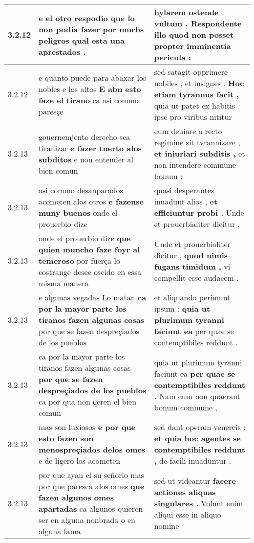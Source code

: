 \begin{tabular}{|p{1cm}|p{6.5cm}|p{6.5cm}|}
3.2.12 & e el otro respodio \textbf{ que lo non podia fazer } por muchs peligros qual esta una aprestados . & hylarem ostende vultum . \textbf{ Respondente illo quod non posset } propter imminentia pericula : \\\hline
3.2.12 & e quanto puede para abaxar los nobles e los altos \textbf{ E abn esto faze el tirano } ca asi commo paresçe & sed satagit opprimere nobiles , et insignes . \textbf{ Hoc etiam tyrannus facit , } quia ut patet ex habitis ipse pro viribus nititur \\\hline
3.2.13 & gouernemjento derecho sea tiranizar \textbf{ e fazer tuerto alos subditos } e non entender al bien comun & cum deuiare a recto regimine sit tyrannizare , \textbf{ et iniuriari subditis , } et non intendere commune bonum ; \\\hline
3.2.13 & asi commo desanparados acometen alos otros \textbf{ e fazense muny buenos } onde el prouerbio dize & quasi desperantes inuadunt alios , \textbf{ et efficiuntur probi . } Unde et prouerbialiter dicitur , \\\hline
3.2.13 & onde el prouerbio dize \textbf{ que quien muncho faze foyr al temeroso } por fuerça lo costrange desee oscido en essa misma manera & Unde et prouerbialiter dicitur , \textbf{ quod nimis fugans timidum , } vi compellit esse audacem . \\\hline
3.2.13 & e algunas vegadas Lo matan \textbf{ ca por la mayor parte los tiranos fazen algunas cosas } por que se fazen despreçiados de los pueblos & et aliquando perimunt ipsum : \textbf{ quia ut plurimum tyranni faciunt ea } per quae se contemptibiles reddunt . \\\hline
3.2.13 & ca por la mayor parte los tiranos fazen algunas cosas \textbf{ por que se fazen despreçiados de los pueblos } ca por qua non qͥeren el bien comun & quia ut plurimum tyranni faciunt ea \textbf{ per quae se contemptibiles reddunt . } Nam cum non quaerant bonum commune , \\\hline
3.2.13 & mas son luxiosos \textbf{ e por que esto fazen son menospreçiados delos omes } e de ligero los acometen & sed dant operam venereis : \textbf{ et quia hoc agentes se contemptibiles reddunt , } de facili inuaduntur . \\\hline
3.2.13 & por que ayan el su señorio mas por que paresca alos omes \textbf{ que fazen algunos omes apartadas } ca algunos quieren ser en alguna nonbrada o en alguna fama & sed ut videantur \textbf{ facere actiones aliquas singulares . } Volunt enim aliqui esse in aliquo nomine \\\hline

\end{tabular}
